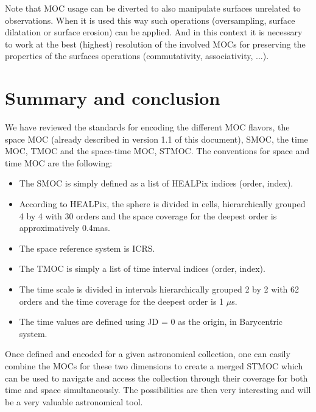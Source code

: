 \documentclass[11pt,a4paper]{ivoa}
\begin{document}
Note that MOC usage can be diverted to also manipulate surfaces unrelated
to observations. When it is used this way such operations (oversampling,
surface dilatation or surface erosion) can be applied. 
And in this context it is necessary to work at the best (highest)
resolution of the involved MOCs for preserving the properties of the
surfaces operations (commutativity, associativity, ...).




\section{Summary and conclusion}
We have reviewed the standards for encoding the different MOC flavors,
the space MOC (already described in version 1.1 of this document),
SMOC, the time MOC, TMOC and the space-time MOC, STMOC. 
The conventions for space and time MOC are the following:
\begin{itemize}
\item The SMOC is simply defined as a list of HEALPix indices (order, index).
\item According to HEALPix, the sphere is divided in cells,
  hierarchically grouped 4 by 4 with 30 orders and the space coverage
  for the deepest order is approximatively 0.4mas.
\item The space reference system is ICRS. 
\item The TMOC is simply a list of time interval indices (order, index).
\item The time scale is divided in intervals hierarchically grouped 2 by
  2 with 62 orders and the time coverage for the deepest order is 1 $\mu$s. 
\item The time values are defined using JD = 0 as the origin, in Barycentric system. 
\end{itemize}

Once defined and encoded for a given astronomical collection, one
can easily combine the MOCs for these two dimensions to create a
merged STMOC which can be used to navigate and access the collection
through their coverage for both time and space simultaneously.
The possibilities are then very interesting and will be a very
valuable astronomical tool.


\end{document}
